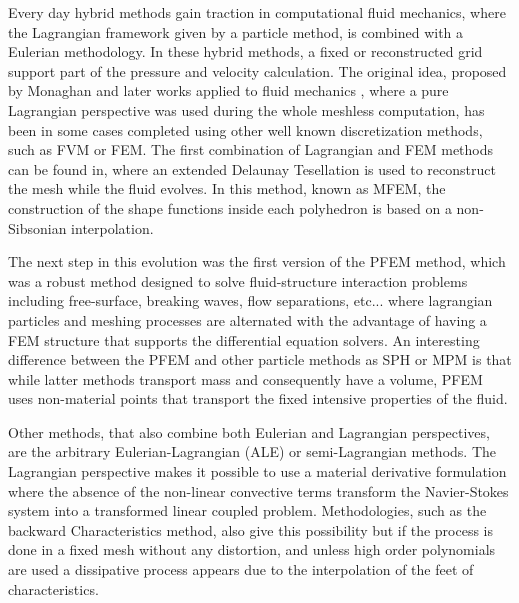 
Every day hybrid methods gain traction in computational fluid mechanics, where the Lagrangian framework given by a particle method, is combined with a Eulerian methodology. In these hybrid methods, a fixed or reconstructed grid support part of the pressure and velocity calculation. The original idea, proposed by Monaghan \cite{Mon77} and later works applied to fluid mechanics \cite{Monaghan88}, where a pure Lagrangian perspective was used during the whole meshless computation, has been in some cases completed using other well known discretization methods, such as FVM\cite{Nestor20091733} or FEM\cite{Ide03}. The first combination of Lagrangian and FEM methods can be found in\cite{Ide03b}, where an extended Delaunay Tesellation is used to reconstruct the mesh while the fluid evolves. In this method, known as MFEM, the construction of the shape functions inside each polyhedron is based on a non-Sibsonian interpolation.

The next step in this evolution was the first version of the PFEM method\cite{Idelsohn04}, which was a robust method designed to solve fluid-structure interaction problems including free-surface, breaking waves, flow separations, etc... where lagrangian particles and meshing processes are alternated with the advantage of having a FEM structure that supports the differential equation solvers. An interesting difference between the PFEM and other particle methods as SPH or MPM\cite{Wieckowsky04} is that while latter methods transport mass and consequently have a volume, PFEM uses non-material points that transport the fixed intensive properties of the fluid.

Other methods, that also combine both Eulerian and Lagrangian perspectives, are the arbitrary Eulerian-Lagrangian (ALE)\cite{Donea83} or semi-Lagrangian methods\cite{Bermejo}. The Lagrangian perspective makes it possible to use a material derivative formulation where the absence of the non-linear convective terms transform the Navier-Stokes system into a transformed linear coupled problem. Methodologies, such as the backward Characteristics method\cite{Bermejo}, also give this possibility but if the process is done in a fixed mesh without any distortion, and unless high order polynomials are used a dissipative process appears due to the interpolation of the feet of characteristics.

